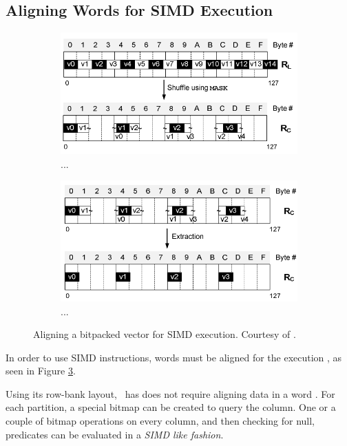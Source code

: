 \subsection{Aligning Words for SIMD Execution}
\label{sub:Aligning words for SIMD execution}
\begin{figure}
  \centering
  \begin{subfigure}{0.45\textwidth}
    \includegraphics[width=\textwidth]{img/simd-align-1.png}
    \caption{...}
    \label{fig:simd-align-1} 
  \end{subfigure}
  \begin{subfigure}{0.45\textwidth}
    \includegraphics[width=\textwidth]{img/simd-align-2.png}
    \caption{...}
    \label{fig:simd-align-2} 
  \end{subfigure}
  \caption{Aligning a bitpacked vector for SIMD execution. Courtesy of \cite{Willhalm2009-hu}.}
  \label{fig:simd-align} 
\end{figure}
In order to use SIMD instructions, words must be aligned for the execution \cite{Willhalm2009-hu}, as seen in Figure \ref{fig:simd-align}.

Using its row-bank layout, \blink~has does not require aligning data in a word \cite{Johnson2008-cp}. For each partition, a special bitmap can be created to query the column. One or a couple of bitmap operations on every column, and then checking for null, predicates can be evaluated in a \textit{SIMD like fashion}.


